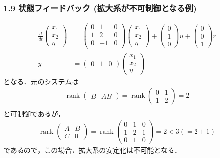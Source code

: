\documentclass[10pt]{beamer}
\begin{document}
\begin{frame}[t]
\frametitle{1.9 状態フィードバック (拡大系が不可制御となる例)}
 

\begin{align}
 \frac{d}{dt}
 \left(
 \begin{array}{c}
  x_1 \\
  x_2 \\
  \eta
 \end{array}
 \right) &=
 \left(
 \begin{array}{ccc}
  0 & 1 & 0 \\
  1 & 2 & 0 \\
  0 & -1 & 0 \\
 \end{array}
 \right)
 \left(
 \begin{array}{c}
  x_1 \\
  x_2 \\
  \eta
 \end{array}
 \right) +
 \left(
 \begin{array}{c}
  0 \\
  1 \\
  0
 \end{array}
 \right) u +
 \left(
 \begin{array}{c}
  0 \\
  0 \\
  1
 \end{array}
 \right) r \\
 y &=
 \left(
 \begin{array}{ccc}
  0 & 1 & 0
 \end{array}
 \right)
 \left(
 \begin{array}{c}
  x_1 \\
  x_2 \\
  \eta
 \end{array}
 \right)
\end{align}
となる．元のシステムは
\begin{gather}
 \operatorname{rank}
 \left(
 \begin{array}{cc}
  B & AB
 \end{array}
 \right) =
 \operatorname{rank}
 \left(
 \begin{array}{cc}
  0 & 1 \\
  1 & 2
 \end{array}
 \right) = 2 \\
\end{gather}
と可制御であるが，
\begin{gather}
 \operatorname{rank}
 \left(
 \begin{array}{cc}
  A & B \\
  C & 0
 \end{array}
 \right) =
 \operatorname{rank}
 \left(
 \begin{array}{ccc}
  0 & 1 & 0 \\
  1 & 2 & 1 \\
  0 & 1 & 0
 \end{array}
 \right) =
 2 < 3(= 2 + 1)
\end{gather}
であるので，この場合，拡大系の安定化は不可能となる．
\end{frame}
\end{document}
